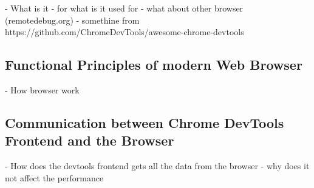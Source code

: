 - What is it
- for what is it used for
- what about other browser (remotedebug.org)
- somethine from https://github.com/ChromeDevTools/awesome-chrome-devtools

\subsection{Functional Principles of modern Web Browser\label{sec:howbrowserwork}}

- How browser work

\subsection{Communication between Chrome DevTools Frontend and the Browser}

- How does the devtools frontend gets all the data from the browser
- why does it not affect the performance
